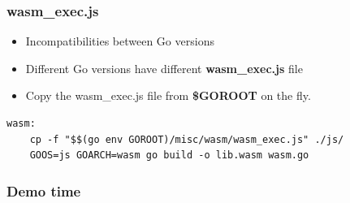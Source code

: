 \documentclass[9pt]{beamer}
\begin{document}
\begin{frame}[fragile]
\frametitle{wasm\_exec.js}


\begin{itemize}
\item Incompatibilities between Go versions
\item Different Go versions have different \textbf{wasm\_exec.js} file
\item Copy the wasm\_exec.js file from \textbf{\$GOROOT} on the fly.
\end{itemize}


\begin{verbatim}
wasm:
    cp -f "$$(go env GOROOT)/misc/wasm/wasm_exec.js" ./js/
    GOOS=js GOARCH=wasm go build -o lib.wasm wasm.go

\end{verbatim}



\end{frame}

\begin{frame}[fragile]
\frametitle{Demo time}


\end{frame}
\end{document}
